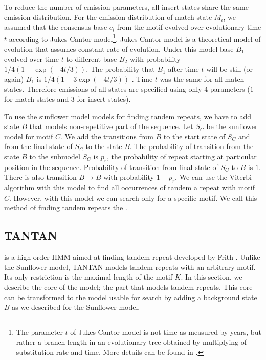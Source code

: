 To reduce the number of emission parameters, all insert states share the same
emission distribution. For the emission distribution of match state $M_i$, we
assumed that the consensus base $c_i$ from the motif evolved over evolutionary
time $t$ according to Jukes-Cantor model\footnote{ The parameter $t$ of
Jukes-Cantor model is not time as measured by years, but rather a branch length
in an evolutionary tree obtained by multiplying of substitution rate and time.
More details can be found in \cite{Durbin1998}.  }. Jukes-Cantor model is a
theoretical model of evolution that assumes constant rate of evolution. Under
this model base $B_1$ evolved over time $t$ to different base $B_2$  with
probability $1/4(1-\exp(-4t/3))$.  The probability that $B_1$ after time $t$
will be still (or again) $B_1$  is $1/4(1+3\exp(-4t/3))$ \cite{Durbin1998}.
Time $t$ was the same for all match states. Therefore emissions of all states
are specified using only $4$ parameters ($1$ for match states and $3$ for
insert states).

To use the sunflower model models for finding tandem repeats, we have to add
state $B$ that models non-repetitive part of the sequence. Let $S_C$ be the
sunflower model for motif $C$. We add the transitions from $B$ to the start
state of $S_C$ and from the final state of $S_C$ to the state $B$. The
probability of transition from the state $B$ to the submodel $S_C$ is $p_r$,
the probability of repeat starting at particular position in the sequence.
Probability of transition from final state of $S_C$ to $B$ is $1$.  There is
also transition $B\to B$ with probability $1-p_r$. We can use the Viterbi
algorithm with this model to find all occurrences of tandem a repeat with motif
$C$. However, with this model we can search only for a specific motif. We call
this method of finding tandem repeats the .

\subsection{TANTAN}\label{SECTION:TANTAN}

 is a high-order HMM aimed at finding tandem repeat
developed by Frith \cite{Frith2011}. Unlike the Sunflower model, TANTAN models
tandem repeats with an arbitrary motif. Its only restriction is the maximal
length of the motif $K$. In this section, we describe the core of the model;
the part that models tandem repeats. This core can be transformed to the model
usable for search by adding a background state $B$ as we described for the
Sunflower model.

